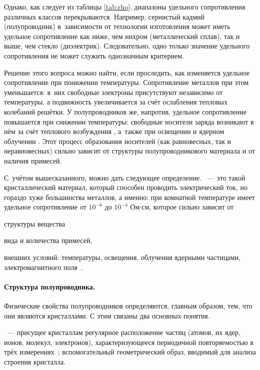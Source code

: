 \documentclass[a4paper, 14pt, titlepage]{extarticle}
\begin{document}
  Однако, как следует из таблицы \ref{tab:rho}, диапазоны удельного сопротивления различных классов
  перекрываются. Например, сернистый кадмий (полупроводник) в~зависимости от технологии изготовления
  может иметь удельное сопротивление как ниже, чем нихром (металлический сплав), так и выше, чем
  стекло (диэлектрик). Следовательно, одно только значение удельного сопротивления не может служить
  однозначным критерием.

  Решение этого вопроса можно найти, если проследить, как изменяется удельное сопротивление при
  понижении температуры. Сопротивление металлов при этом уменьшается: в~них свободные электроны
  присутствуют независимо от температуры, а подвижность увеличивается за счёт ослабления тепловых
  колебаний решётки. У полупроводников же, напротив, удельное сопротивление повышается при снижении
  температуры: свободные носители заряда возникают в нём за счёт теплового возбуждения
  , а~также при освещении и ядерном облучении .
  Этот процесс образования носителей (как равновесных, так и неравновесных) сильно зависит от
  структуры полупроводникового материала и от наличия примесей.

  С~учётом вышесказанного, можно дать следующее определение. ~--- это такой кристаллический
  материал, который способен проводить электрический ток, но гораздо хуже большинства металлов, а
  именно: при комнатной температуре имеет удельное сопротивление от $10^{-6}$ до $10^{-4}$
  Ом$\cdot$см, которое сильно зависит от
  \begin{enumerate*}[label=\asbuk*)]
    \item структуры вещества
    \item вида и количества примесей,
    \item внешних условий: температуры, освещения, облучения ядерными частицами, электромагнитного
      поля~\cite{shalimova-semiconductors}.
  \end{enumerate*}

  \paragraph{Структура полупроводника.} Физические свойства полупроводников определяются, главным
  образом, тем, что они являются кристаллами. С этим связаны два основных понятия.

  ~--- присущее кристаллам регулярное расположение частиц (атомов, их
  ядер, ионов, молекул, электронов), характеризующееся периодичной повторяемостью в трёх
  измерениях~\cite{physenc-crystall}; вспомогательный геометрический образ, вводимый для анализа
  строения кристалла.
\end{document}
